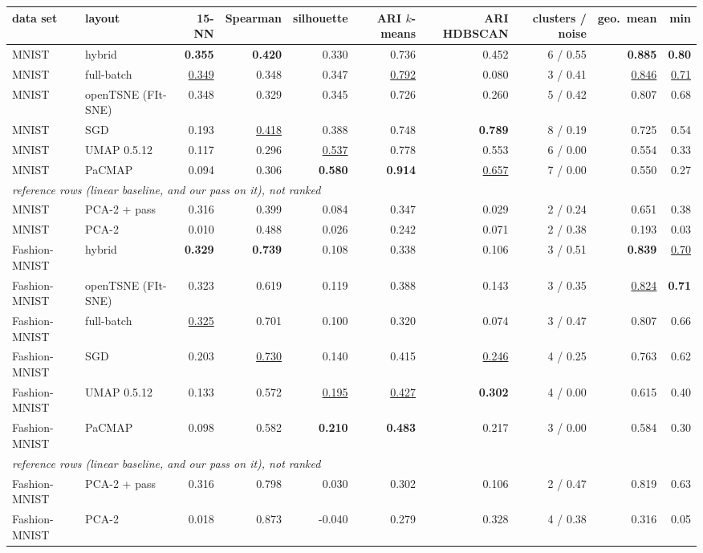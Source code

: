 \begin{tabular}{llrrrrrrrr}
\toprule
data set & layout & 15-NN & Spearman & silhouette & ARI $k$-means & ARI HDBSCAN & clusters / noise & geo.\ mean & min \\
\midrule
MNIST & \magnet{} hybrid & \textbf{0.355} & \textbf{0.420} & 0.330 & 0.736 & 0.452 & 6 / 0.55 & \textbf{0.885} & \textbf{0.80} \\
MNIST & \magnet{} full-batch & \underline{0.349} & 0.348 & 0.347 & \underline{0.792} & 0.080 & 3 / 0.41 & \underline{0.846} & \underline{0.71} \\
MNIST & openTSNE (FIt-SNE) & 0.348 & 0.329 & 0.345 & 0.726 & 0.260 & 5 / 0.42 & 0.807 & 0.68 \\
MNIST & \magnet{} SGD & 0.193 & \underline{0.418} & 0.388 & 0.748 & \textbf{0.789} & 8 / 0.19 & 0.725 & 0.54 \\
MNIST & UMAP 0.5.12 & 0.117 & 0.296 & \underline{0.537} & 0.778 & 0.553 & 6 / 0.00 & 0.554 & 0.33 \\
MNIST & PaCMAP & 0.094 & 0.306 & \textbf{0.580} & \textbf{0.914} & \underline{0.657} & 7 / 0.00 & 0.550 & 0.27 \\
\multicolumn{10}{l}{\quad\emph{reference rows (linear baseline, and our pass on it), not ranked}} \\
MNIST & PCA-2 + pass & 0.316 & 0.399 & 0.084 & 0.347 & 0.029 & 2 / 0.24 & 0.651 & 0.38 \\
MNIST & PCA-2 & 0.010 & 0.488 & 0.026 & 0.242 & 0.071 & 2 / 0.38 & 0.193 & 0.03 \\
\midrule
Fashion-MNIST & \magnet{} hybrid & \textbf{0.329} & \textbf{0.739} & 0.108 & 0.338 & 0.106 & 3 / 0.51 & \textbf{0.839} & \underline{0.70} \\
Fashion-MNIST & openTSNE (FIt-SNE) & 0.323 & 0.619 & 0.119 & 0.388 & 0.143 & 3 / 0.35 & \underline{0.824} & \textbf{0.71} \\
Fashion-MNIST & \magnet{} full-batch & \underline{0.325} & 0.701 & 0.100 & 0.320 & 0.074 & 3 / 0.47 & 0.807 & 0.66 \\
Fashion-MNIST & \magnet{} SGD & 0.203 & \underline{0.730} & 0.140 & 0.415 & \underline{0.246} & 4 / 0.25 & 0.763 & 0.62 \\
Fashion-MNIST & UMAP 0.5.12 & 0.133 & 0.572 & \underline{0.195} & \underline{0.427} & \textbf{0.302} & 4 / 0.00 & 0.615 & 0.40 \\
Fashion-MNIST & PaCMAP & 0.098 & 0.582 & \textbf{0.210} & \textbf{0.483} & 0.217 & 3 / 0.00 & 0.584 & 0.30 \\
\multicolumn{10}{l}{\quad\emph{reference rows (linear baseline, and our pass on it), not ranked}} \\
Fashion-MNIST & PCA-2 + pass & 0.316 & 0.798 & 0.030 & 0.302 & 0.106 & 2 / 0.47 & 0.819 & 0.63 \\
Fashion-MNIST & PCA-2 & 0.018 & 0.873 & -0.040 & 0.279 & 0.328 & 4 / 0.38 & 0.316 & 0.05 \\
\bottomrule
\end{tabular}
